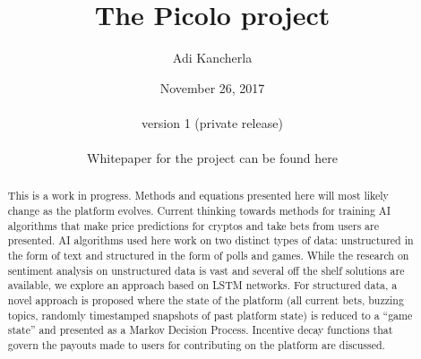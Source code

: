 \documentclass[a4paper]{article}
\begin{document}
\pagecolor{oldlace}

\title{The Picolo project}
\author{Adi Kancherla}
\date{November 26, 2017 \\\hfill \\version 1 (private release) \\\hfill \\Whitepaper for the project can be found here \cite{Picolo_Whitepaper}}

\maketitle

\begin{abstract}
This is a work in progress. Methods and equations presented here will most likely change as the platform evolves. Current thinking towards methods for training AI algorithms that make price predictions for cryptos and take bets from users are presented. AI algorithms used here work on two distinct types of data: unstructured in the form of text and structured in the form of polls and games. While the research on sentiment analysis on unstructured data is vast and several off the shelf solutions are available, we explore an approach based on LSTM networks. For structured data, a novel approach is proposed where the state of the platform (all current bets, buzzing topics, randomly timestamped snapshots of past platform state) is reduced to a “game state” and presented as a Markov Decision Process. Incentive decay functions that govern the payouts made to users for contributing on the platform are discussed. 
\end{abstract}


\end{document}
